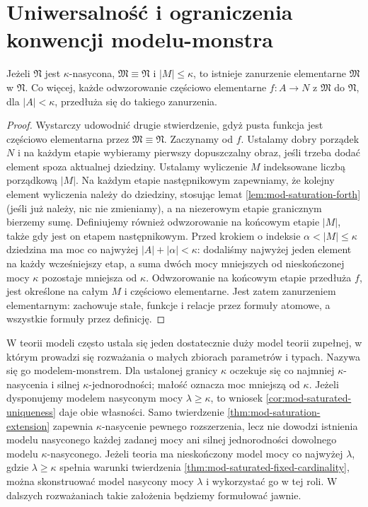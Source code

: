 \section{Uniwersalność i ograniczenia konwencji modelu-monstra}
\begin{twierdzenie}
\label{thm:mod-saturated-universal}
Jeżeli $\mathfrak N$ jest $\kappa$-nasycona,
$\mathfrak M\equiv\mathfrak N$ i $|M|\leq\kappa$,
to istnieje zanurzenie elementarne $\mathfrak M$
w $\mathfrak N$. Co więcej, każde odwzorowanie częściowo
elementarne $f:A\to N$ z $\mathfrak M$ do $\mathfrak N$,
dla $|A|<\kappa$, przedłuża się do takiego zanurzenia.
\end{twierdzenie}
\begin{proof}
Wystarczy udowodnić drugie stwierdzenie, gdyż pusta
funkcja jest częściowo elementarna przez
$\mathfrak M\equiv\mathfrak N$. Zaczynamy od $f$.
Ustalamy dobry porządek $N$ i na każdym etapie
wybieramy pierwszy dopuszczalny obraz, jeśli trzeba
dodać element spoza aktualnej dziedziny.
Ustalamy wyliczenie
$M$ indeksowane liczbą porządkową $|M|$.
Na każdym etapie następnikowym zapewniamy, że kolejny
element wyliczenia należy do dziedziny, stosując lemat
\ref{lem:mod-saturation-forth} (jeśli już należy, nic
nie zmieniamy),
a na niezerowym etapie granicznym bierzemy sumę.
Definiujemy również odwzorowanie na końcowym etapie
$|M|$, także gdy jest on etapem następnikowym.
Przed krokiem o indeksie $\alpha<|M|\leq\kappa$
dziedzina ma moc co najwyżej $|A|+|\alpha|<\kappa$:
dodaliśmy najwyżej jeden element na każdy wcześniejszy
etap, a suma dwóch mocy mniejszych od nieskończonej
mocy $\kappa$ pozostaje mniejsza od $\kappa$.
Odwzorowanie na końcowym etapie przedłuża $f$,
jest określone na całym $M$ i częściowo elementarne. Jest zatem zanurzeniem elementarnym:
zachowuje stałe, funkcje i relacje przez formuły atomowe,
a wszystkie formuły przez definicję.
\end{proof}

\begin{uwaga}
\label{rem:mod-monster-model}
W teorii modeli często ustala się jeden dostatecznie duży
model teorii zupełnej, w którym prowadzi się rozważania
o małych zbiorach parametrów i typach. Nazywa się go
modelem-monstrem. Dla ustalonej granicy $\kappa$ oczekuje
się co najmniej $\kappa$-nasycenia i silnej
$\kappa$-jednorodności; małość oznacza moc mniejszą
od $\kappa$. Jeżeli dysponujemy modelem nasyconym mocy
$\lambda\geq\kappa$, to wniosek
\ref{cor:mod-saturated-uniqueness} daje obie własności.
Samo twierdzenie \ref{thm:mod-saturation-extension}
zapewnia $\kappa$-nasycenie pewnego rozszerzenia, lecz
nie dowodzi istnienia modelu nasyconego każdej zadanej
mocy ani silnej jednorodności dowolnego modelu
$\kappa$-nasyconego. Jeżeli teoria ma nieskończony model
mocy co najwyżej $\lambda$, gdzie $\lambda\geq\kappa$
spełnia warunki twierdzenia
\ref{thm:mod-saturated-fixed-cardinality}, można skonstruować
model nasycony mocy $\lambda$ i wykorzystać go w tej roli.
W dalszych rozważaniach takie założenia będziemy
formułować jawnie.
\end{uwaga}

